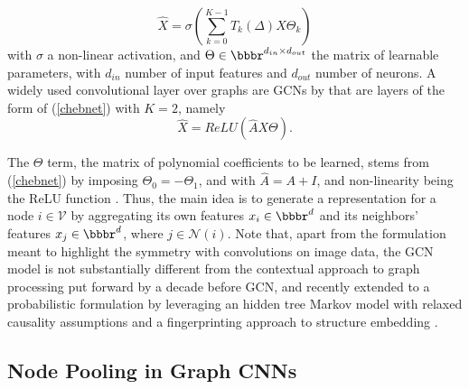 \documentclass[runningheads]{llncs}
\begin{document}
\begin{equation}\label{chebnet}
	\hat{X} = \sigma \left( \sum_{k=0}^{K-1} T_k\left(\Delta\right) X \Theta_k \right)
\end{equation}
with $\sigma$ a non-linear activation, and $\Theta \in \bbbr^{d_{in} \times d_{out}}$ the matrix of learnable parameters, with $d_{in}$ number of input features and $d_{out}$ number of neurons. A widely used convolutional layer over graphs are GCNs by \cite{DBLP:journals/corr/KipfW16} that are layers of the form of (\ref{chebnet}) with $K = 2$, namely
\begin{equation}\label{gcn}
	\hat{X} = ReLU \left( \hat{A}X\Theta \right).
\end{equation}

The $\Theta$ term, the matrix of polynomial coefficients to be learned, stems from (\ref{chebnet}) by imposing $\Theta_0 = - \Theta_1$, and with $\hat{A} = A + I$, and non-linearity being the ReLU function \cite{DBLP:journals/corr/KipfW16}. Thus, the main idea is to generate a representation for a node $i \in \mathcal{V}$ by aggregating its own features $x_{i} \in \bbbr^{d}$ and its neighbors’ features $x_{j} \in \bbbr^{d}$, where $j \in \mathcal{N}(i)$.
Note that, apart from the formulation meant to highlight the symmetry with convolutions on image data, the GCN model is not substantially different from the contextual approach to graph processing put forward by \cite{micheli} a decade before GCN, and recently extended to a probabilistic formulation \cite{pmlr-v80-bacciu18a} by leveraging an hidden tree Markov model \cite{gtmsd} with relaxed causality assumptions and a fingerprinting approach to structure embedding \cite{tnnlsKernel}.

\subsection{Node Pooling in Graph CNNs}
\end{document}
